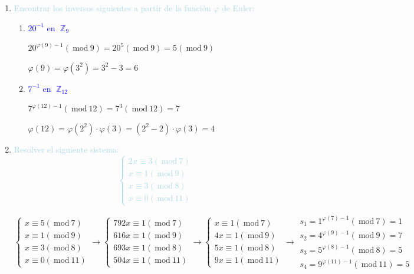\documentclass{article}
\newcommand{\lb}[1]{\textcolor{lightblue}{#1}}
\newcommand{\db}[1]{\textcolor{blue}{#1}}
\DeclareMathOperator{\Z}{\mathbb{Z}}
\renewcommand{\mod}{~\mathrm{mod}~}
\begin{document}
\begin{enumerate}[label=\color{red}\textbf{\arabic*)}, leftmargin=*]
\begin{enumerate}[label=\color{red}\alph*)]
	\end{enumerate}
	\item \lb{Encontrar los inversos siguientes a partir de la función $\varphi$ de Euler:}
	\begin{enumerate}[label=\color{red}\alph*)]
		\item \db{$20^{-1}$ en $\Z_9$}
        
        $20^{\varphi(9)-1}(\mod 9)=20^5(\mod 9)=5(\mod 9)$
        
        $\varphi(9)=\varphi(3^2)=3^2-3=6$
		\item \db{$7^{-1}$ en $\Z_{12}$}
        
        $7^{\varphi(12)-1}(\mod12)=7^3(\mod12)=7$
        
        $\varphi(12)=\varphi(2^2)\cdot\varphi(3)=(2^2-2)\cdot\varphi(3)=4$
	\end{enumerate}
	\item \lb{Resolver el siguiente sistema:\[ \begin{cases}
			2x\equiv3(\mod 7)\\
			x\equiv 1(\mod9)\\
			x\equiv3(\mod 8)\\
			x\equiv0(\mod11)
		\end{cases} \]}
	
    $\begin{cases}
    			x\equiv5(\mod 7)\\
    			x\equiv 1(\mod9)\\
    			x\equiv3(\mod 8)\\
    			x\equiv0(\mod11)
    		\end{cases}\longrightarrow\begin{cases}
            			792x\equiv1(\mod 7)\\
            			616x\equiv 1(\mod9)\\
            			693x\equiv1(\mod 8)\\
            			504x\equiv1(\mod11)
            		\end{cases}\longrightarrow\begin{cases}
                    			x\equiv1(\mod 7)\\
                    			4x\equiv 1(\mod9)\\
                    			5x\equiv1(\mod 8)\\
                    			9x\equiv1(\mod11)
                    		\end{cases}\longrightarrow\begin{array}{l}
                            s_1=1^{\varphi(7)-1}(\mod 7)=1\\
                            s_2=4^{\varphi(9)-1}(\mod 9)=7\\
                            s_3=5^{\varphi(8)-1}(\mod8)=5\\
                            s_4=9^{\varphi(11)-1}(\mod11)=5
                            \end{array}
                    	$
                        

\end{enumerate}
\end{document}
